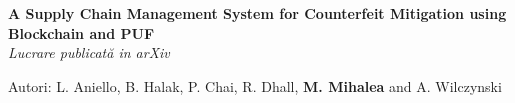 
\bigskip
{}%
\textbf{A Supply Chain Management System for Counterfeit Mitigation using Blockchain and PUF}\\
\emph{Lucrare publicată in arXiv}
\begin{itemize*}
    \item Autori: L. Aniello, B. Halak, P. Chai, R. Dhall, \textbf{M. Mihalea} and A. Wilczynski\\
\end{itemize*}